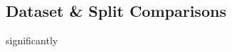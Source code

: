 \subsection{Dataset \& Split Comparisons}
\label{subsec:dataset_split_comparisons}

 significantly

